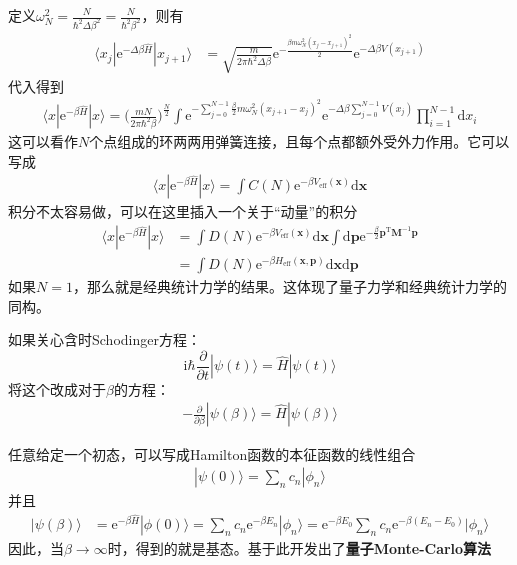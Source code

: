\documentclass[12pt]{article}
\begin{document}
定义$\omega_N^2 = \frac N{\hbar^2 \Delta \beta^2} = \frac N{\hbar^2 \beta^2}$，则有
\begin{align*}
    \langle x_j|\mathrm{e}^{-\Delta \beta \hat{H}} |x_{j+1} \rangle &= \sqrt{\frac m{2\pi \hbar^2 \Delta \beta}} \mathrm{e}^{-\frac {\beta m\omega_N^2(x_j- x_{j+1})^2}{2}} \mathrm{e}^{-\Delta \beta V(x_{j+1})}
\end{align*}
代入得到 
\begin{align*}
    \langle x|\mathrm{e}^{-\beta \hat{H}}|x\rangle  = \bigg(\frac {mN}{2\pi \hbar^2 \beta}\bigg)^{\frac N2} \int \mathrm{e}^{-\sum_{j=0}^{N-1} \frac {\beta}2 m \omega_N^2 (x_{j+1} - x_j)^2} \mathrm{e}^{-\Delta \beta \sum_{j=0}^{N-1}V(x_j)}\prod_{i=1}^{N-1}\mathrm{d}x_i
\end{align*}
这可以看作$N$个点组成的环两两用弹簧连接，且每个点都额外受外力作用。它可以写成
\begin{align*}
    \langle x|\mathrm{e}^{-\beta \hat{H}}|x\rangle  = \int C(N) \mathrm{e}^{-\beta V_{\mathrm{eff}}(\bm{x})} \mathrm{d}\bm{x}
\end{align*}
积分不太容易做，可以在这里插入一个关于“动量”的积分
\begin{align*}
    \langle x|\mathrm{e}^{-\beta \hat{H}}|x\rangle  &= \int D(N) \mathrm{e}^{-\beta V_{\mathrm{eff}}(\bm{x})} \mathrm{d}\bm{x} \int \mathrm{d}\bm{p} \mathrm{e}^{-\frac {\beta}2 \bm{p}^{\mathrm{T}}\bm{M}^{-1} \bm{p}}\\
    &= \int D(N) \mathrm{e}^{-\beta H_{\mathrm{eff}}(\bm{x,p})} \mathrm{d}\bm{x} \mathrm{d}\bm{p}
\end{align*}
如果$N=1$，那么就是经典统计力学的结果。这体现了量子力学和经典统计力学的同构。

如果关心含时Schodinger方程：
\begin{equation*}
    \mathrm{i}\hbar \frac {\partial}{\partial t} | \psi(t) \rangle = \hat{H}|\psi(t) \rangle
\end{equation*}
将这个改成对于$\beta$的方程：
\begin{align*}
    -\frac {\partial}{\partial \beta} |\psi(\beta) \rangle = \hat{H} |\psi(\beta) \rangle
\end{align*}

任意给定一个初态，可以写成Hamilton函数的本征函数的线性组合
\begin{align*}
    |\psi(0) \rangle = \sum_n c_n |\phi_n\rangle
\end{align*}
并且
\begin{align*}
    |\psi(\beta) \rangle &= \mathrm{e}^{-\beta \hat{H}} |\phi(0) \rangle = \sum_n c_n\mathrm{e}^{-\beta E_n}|\phi_n \rangle = \mathrm{e}^{-\beta E_0} \sum_n c_n \mathrm{e}^{-\beta(E_n-E_0)} |\phi_n \rangle
\end{align*}
因此，当$\beta \to \infty$时，得到的就是基态。基于此开发出了\textbf{量子Monte-Carlo算法}
\end{document}

